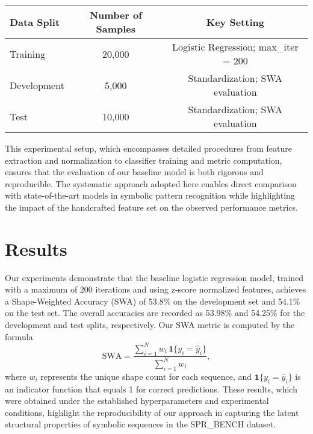 \documentclass{article}
\begin{document}
\begin{center}
\begin{tabular}{lcc}
\hline
\textbf{Data Split} & \textbf{Number of Samples} & \textbf{Key Setting} \\
\hline
Training & 20,000 & Logistic Regression; max\_iter = 200 \\
Development & 5,000 & Standardization; SWA evaluation \\
Test & 10,000 & Standardization; SWA evaluation \\
\hline
\end{tabular}
\end{center}

This experimental setup, which encompasses detailed procedures from feature extraction and normalization to classifier training and metric computation, ensures that the evaluation of our baseline model is both rigorous and reproducible. The systematic approach adopted here enables direct comparison with state-of-the-art models in symbolic pattern recognition while highlighting the impact of the handcrafted feature set on the observed performance metrics.

\section{Results}
Our experiments demonstrate that the baseline logistic regression model, trained with a maximum of 200 iterations and using z-score normalized features, achieves a Shape-Weighted Accuracy (SWA) of 53.8\% on the development set and 54.1\% on the test set. The overall accuracies are recorded as 53.98\% and 54.25\% for the development and test splits, respectively. Our SWA metric is computed by the formula 
\[
\text{SWA} = \frac{\sum_{i=1}^{N} w_i\, \mathbf{1}\{y_i = \hat{y}_i\}}{\sum_{i=1}^{N} w_i},
\]
where \(w_i\) represents the unique shape count for each sequence, and \(\mathbf{1}\{y_i = \hat{y}_i\}\) is an indicator function that equals 1 for correct predictions. These results, which were obtained under the established hyperparameters and experimental conditions, highlight the reproducibility of our approach in capturing the latent structural properties of symbolic sequences in the SPR\_BENCH dataset.
\end{document}
